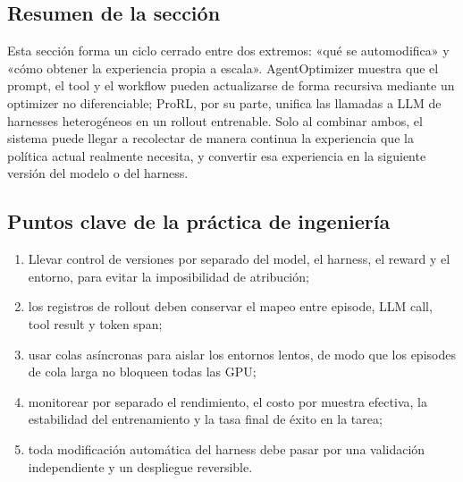 
\subsection{Resumen de la sección}

Esta sección forma un ciclo cerrado entre dos extremos: «qué se automodifica» y «cómo obtener la experiencia propia a escala». AgentOptimizer muestra que el prompt, el tool y el workflow pueden actualizarse de forma recursiva mediante un optimizer no diferenciable; ProRL, por su parte, unifica las llamadas a LLM de harnesses heterogéneos en un rollout entrenable. Solo al combinar ambos, el sistema puede llegar a recolectar de manera continua la experiencia que la política actual realmente necesita, y convertir esa experiencia en la siguiente versión del modelo o del harness.

\subsection{Puntos clave de la práctica de ingeniería}

\begin{enumerate}
    \item Llevar control de versiones por separado del model, el harness, el reward y el entorno, para evitar la imposibilidad de atribución;
    \item los registros de rollout deben conservar el mapeo entre episode, LLM call, tool result y token span;
    \item usar colas asíncronas para aislar los entornos lentos, de modo que los episodes de cola larga no bloqueen todas las GPU;
    \item monitorear por separado el rendimiento, el costo por muestra efectiva, la estabilidad del entrenamiento y la tasa final de éxito en la tarea;
    \item toda modificación automática del harness debe pasar por una validación independiente y un despliegue reversible.
\end{enumerate}

